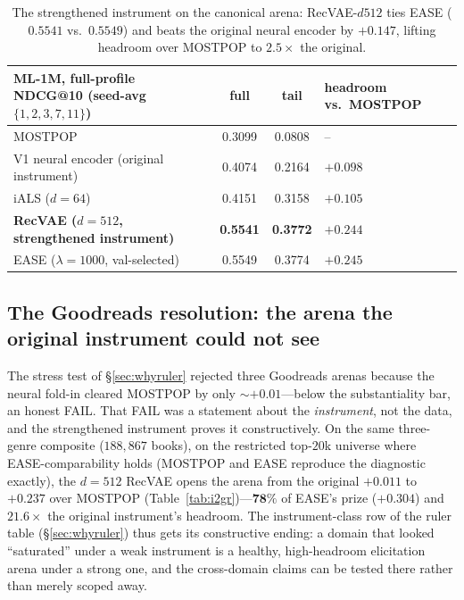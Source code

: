 \documentclass[11pt]{article}
\begin{document}
\begin{table}[h]\centering\small
\begin{tabular}{lccl}
\toprule
ML-1M, full-profile NDCG@10 (seed-avg $\{1,2,3,7,11\}$) & full & tail & headroom vs.\ MOSTPOP\\
\midrule
MOSTPOP & 0.3099 & 0.0808 & --\\
V1 neural encoder (original instrument) & 0.4074 & 0.2164 & $+0.098$\\
iALS ($d{=}64$) & 0.4151 & 0.3158 & $+0.105$\\
\textbf{RecVAE ($d{=}512$, strengthened instrument)} & \textbf{0.5541} & \textbf{0.3772} & $\mathbf{+0.244}$\\
EASE ($\lambda{=}1000$, val-selected) & 0.5549 & 0.3774 & $+0.245$\\
\bottomrule
\end{tabular}
\caption{The strengthened instrument on the canonical arena: RecVAE-$d512$ ties EASE ($0.5541$ vs.\ $0.5549$) and beats
the original neural encoder by $+0.147$, lifting headroom over MOSTPOP to $2.5\times$ the original.}
\label{tab:i2ml1m}
\end{table}

\subsection{The Goodreads resolution: the arena the original instrument could not see}\label{sec:i2goodreads}
The stress test of \S\ref{sec:whyruler} rejected three Goodreads arenas because the neural fold-in cleared MOSTPOP by
only ${\sim}+0.01$---below the substantiality bar, an honest FAIL. That FAIL was a statement about the \emph{instrument},
not the data, and the strengthened instrument proves it constructively. On the same three-genre composite ($188{,}867$
books), on the restricted top-$20$k universe where EASE-comparability holds (MOSTPOP and EASE reproduce the diagnostic
exactly), the $d{=}512$ RecVAE opens the arena from the original $+0.011$ to $\mathbf{+0.237}$ over MOSTPOP
(Table~\ref{tab:i2gr})---$\mathbf{78\%}$ of EASE's prize ($+0.304$) and $\mathbf{21.6\times}$ the original instrument's
headroom. The instrument-class row of the ruler table (\S\ref{sec:whyruler}) thus gets its constructive ending: a domain
that looked ``saturated'' under a weak instrument is a healthy, high-headroom elicitation arena under a strong one, and
the cross-domain claims can be tested there rather than merely scoped away.
\end{document}
